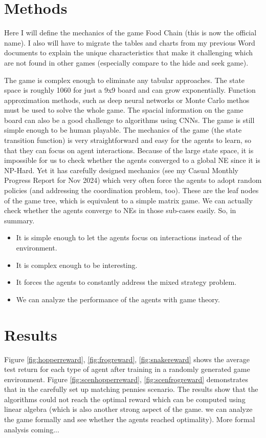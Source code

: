 \documentclass[a4paper]{article}
\begin{document}
\begin{multicols}{2}
\section{Methods}
Here I will define the mechanics of the game Food Chain (this is now the official name). I also will have to migrate the tables and charts from my previous Word documents to explain the unique characteristics that make it challenging which are not found in other games (especially compare to the hide and seek game).

The game is complex enough to eliminate any tabular approaches. The state space is roughly 1060 for just a 9x9 board and can grow exponentially. Function approximation methods, such as deep neural networks or Monte Carlo methos must be used to solve the whole game. The spacial information on the game board can also be a good challenge to algorithms using CNNs. The game is still simple enough to be human playable. The mechanics of the game (the state transition function) is very straightforward and easy for the agents to learn, so that they can focus on agent interactions. Because of the large state space, it is impossible for us to check whether the agents converged to a global NE since it is NP-Hard. Yet it has carefully designed mechanics (see my Casual Monthly Progress Report for Nov 2024) which very often force the agents to adopt random policies (and addressing the coordination problem, too). These are the leaf nodes of the game tree, which is equivalent to a simple matrix game. We can actually check whether the agents converge to NEs in those sub-cases easily. So, in summary.
\begin{itemize}
    \item It is simple enough to let the agents focus on interactions instead of the environment.
    \item It is complex enough to be interesting.
    \item It forces the agents to constantly address the mixed strategy problem.
    \item We can analyze the performance of the agents with game theory.
\end{itemize}

\section{Results}
Figure \ref{fig:hopperreward}, \ref{fig:frogreward}, \ref{fig:snakereward} shows the average test return for each type of agent after training in a randomly generated game environment. Figure \ref{fig:scenhopperreward}, \ref{fig:scenfrogreward} demonstrates that in the carefully set up matching pennies scenario. The results show that the algorithms could not reach the optimal reward which can be computed using linear algebra (which is also another strong aspect of the game. we can analyze the game formally and see whether the agents reached optimality). More formal analysis coming...


\end{multicols}
\end{document}
